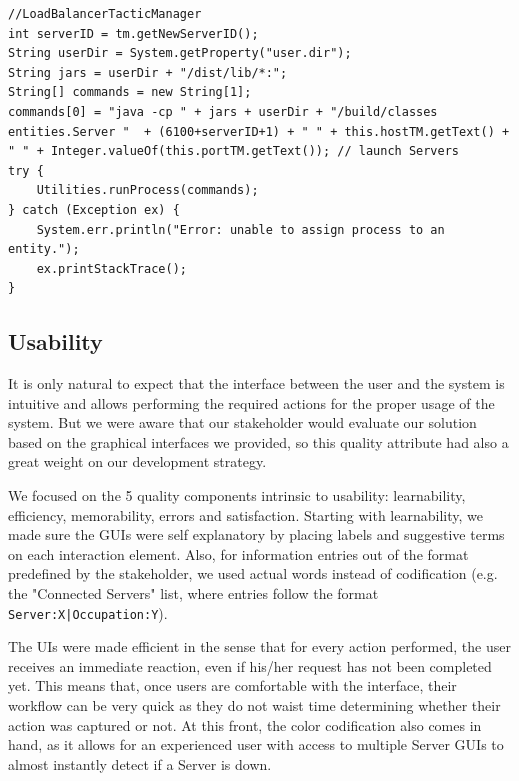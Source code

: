 \documentclass[12pt]{article}
\begin{document}
\begin{lstlisting}
//LoadBalancerTacticManager
int serverID = tm.getNewServerID();
String userDir = System.getProperty("user.dir");
String jars = userDir + "/dist/lib/*:";
String[] commands = new String[1];
commands[0] = "java -cp " + jars + userDir + "/build/classes entities.Server "  + (6100+serverID+1) + " " + this.hostTM.getText() + " " + Integer.valueOf(this.portTM.getText()); // launch Servers
try {
    Utilities.runProcess(commands);
} catch (Exception ex) {
    System.err.println("Error: unable to assign process to an entity.");
    ex.printStackTrace();
}
\end{lstlisting}

\subsection{Usability} \label{usability}

It is only natural to expect that the interface between the user and the system is intuitive and allows performing the required actions for the proper usage of 
the system.
But we were aware that our stakeholder would evaluate our solution based on the graphical interfaces we provided, so this quality attribute had also a great 
weight on our development strategy.

We focused on the 5 quality components intrinsic to usability: learnability, efficiency, memorability, errors and satisfaction.
Starting with learnability, we made sure the GUIs were self explanatory by placing labels and suggestive terms on each interaction element.
Also, for information entries out of the format predefined by the stakeholder, we used actual words instead of codification (e.g. the "Connected Servers" list,
where entries follow the format \texttt{Server:X|Occupation:Y}).

The UIs were made efficient in the sense that for every action performed, the user receives an immediate reaction, even if his/her request has not been completed yet.
This means that, once users are comfortable with the interface, their workflow can be very quick as they do not waist time determining whether their action was 
captured or not.
At this front, the color codification also comes in hand, as it allows for an experienced user with access to multiple Server GUIs to almost instantly detect 
if a Server is down.
\end{document}
